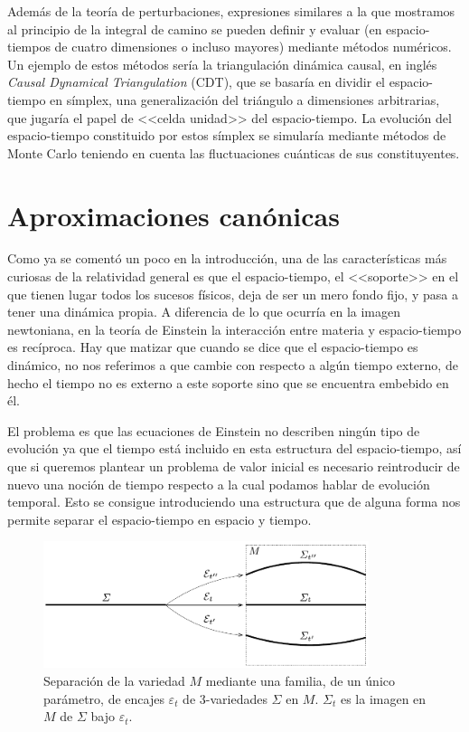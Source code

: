 \documentclass[11pt,a4paper,titlepage]{article}
\begin{document}
Además de la teoría de perturbaciones, expresiones similares a la que mostramos al principio de la integral de camino se pueden definir y evaluar (en espacio-tiempos de cuatro dimensiones o incluso mayores) mediante métodos numéricos. Un ejemplo de estos métodos sería la triangulación dinámica causal, en inglés \emph{Causal Dynamical Triangulation} (CDT), que se basaría en dividir el espacio-tiempo en símplex, una generalización del triángulo a dimensiones arbitrarias, que jugaría el papel de <<celda unidad>> del espacio-tiempo. La evolución del espacio-tiempo constituido por estos símplex se simularía mediante métodos de Monte Carlo teniendo en cuenta las fluctuaciones cuánticas de sus constituyentes.
%
%
%
%
\newpage
\section{Aproximaciones canónicas} %

Como ya se comentó un poco en la introducción, una de las características más curiosas de la relatividad general es que el espacio-tiempo, el <<soporte>> en el que tienen lugar todos los sucesos físicos, deja de ser un mero fondo fijo, y pasa a tener una dinámica propia. A diferencia de lo que ocurría en la imagen newtoniana, en la teoría de Einstein la interacción entre materia y espacio-tiempo es recíproca. Hay que matizar que cuando se dice que el espacio-tiempo es dinámico, no nos referimos a que cambie con respecto a algún tiempo externo, de hecho el tiempo no es externo a este soporte sino que se encuentra embebido en él.

El problema es que las ecuaciones de Einstein no describen ningún tipo de evolución ya que el tiempo está incluido en esta estructura del espacio-tiempo, así que si queremos plantear un problema de valor inicial es necesario reintroducir de nuevo una noción de tiempo respecto a la cual podamos hablar de evolución temporal. Esto se consigue introduciendo una estructura que de alguna forma nos permite separar el espacio-tiempo en espacio y tiempo.

\begin{figure}[ht]
\centering
\includegraphics[width=0.85\textwidth]{FoilM.png}
\caption{Separación de la variedad $M$ mediante una familia, de un único parámetro, de encajes $\varepsilon_t$ de 3-variedades $\Sigma$ en $M$. $\Sigma_t$ es la imagen en $M$ de $\Sigma$ bajo $\varepsilon_t$.}
\label{fig:FoilM}
\end{figure}
\end{document}
